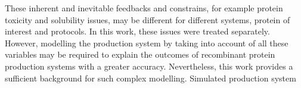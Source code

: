  These inherent and inevitable feedbacks and constrains, for example protein toxicity and solubility issues, may be different for different systems, protein of interest and protocols. In this work, these issues were treated separately. However, modelling the production system by taking into account of all these variables may be required to explain the outcomes of recombinant protein production systems with a greater accuracy. Nevertheless, this work provides a sufficient background for such complex modelling. Simulated production system 


